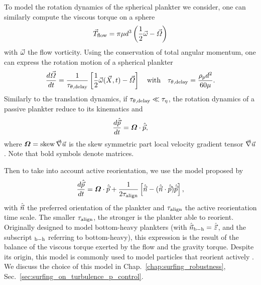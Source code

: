 To model the rotation dynamics of the spherical plankter we consider, one can similarly compute the viscous torque on a sphere \citep{lamb1945hydrodynamics}
\begin{equation}\label{eq:translation}
	\vec{T}_{\mathrm{flow}} = \pi \mu d^3 \left( \frac{1}{2} \vec{\omega} - \vec{\varOmega} \right)
\end{equation}
with $\vec{\omega}$ the flow vorticity.
Using the conservation of total angular momentum, one can express the rotation motion of a spherical plankter
\begin{equation}\label{eq:stokes_rotation}
	\frac{d \vec{\varOmega}}{d t} = \frac{1}{\tau_{\theta,\mathrm{delay}}} \left[ \frac{1}{2} \vec{\omega}(\vec{X}, t) - \vec{\varOmega} \right] \quad \text{with} \quad \tau_{\theta,\mathrm{delay}} = \frac{\rho_p d^2}{60 \mu}.
\end{equation}
Similarly to the translation dynamics, if $\tau_{\theta,\mathrm{delay}} \ll \tau_{\eta}$, the rotation dynamics of a passive plankter reduce to its kinematics and
\begin{equation}
	\frac{d \hat{\vec{p}}}{d t} = \boldsymbol{\varOmega} \cdot \hat{\vec{p}},
\end{equation}
where $\boldsymbol{\varOmega} = \operatorname{skew} \vec{\nabla} \vec{u}$ is the skew symmetric part local velocity gradient tensor $\vec{\nabla} \vec{u}$.
Note that bold symbols denote matrices.

Then to take into account active reorientation, we use the model proposed by \citet{Pedley1992}
\begin{equation}\label{eq:pedley_orientation}
		\frac{d \hat{\vec{p}}}{d t}  =  
		\boldsymbol{\varOmega} \cdot \hat{\vec{p}} + \frac{1}{2 \tau_{\mathrm{align}}} \left[ \hat{\vec{n}} - (\hat{\vec{n}} \cdot \hat{\vec{p}}) \hat{\vec{p}} \right],
\end{equation}
with $\hat{\vec{n}}$ the preferred orientation of the plankter and $\tau_{\mathrm{align}}$ the active reorientation time scale.
The smaller $\tau_{\mathrm{align}}$, the stronger is the plankter able to reorient.
Originally designed to model bottom-heavy plankters (with $\hat{\vec{n}}_{\mathrm{b-h}} = \hat{\vec{z}}$, and the subscript $_{\mathrm{b-h}}$ referring to bottom-heavy), this expression is the result of the balance of the viscous torque exerted by the flow and the gravity torque.
Despite its origin, this model is commonly used to model particles that reorient actively \citep{colabrese2017flow, gustavsson2017finding, lange2021sperm}.
We discuss the choice of this model in Chap.~\ref{chap:surfing_robustness}, Sec.~\ref{sec:surfing_on_turbulence_p_control}.

